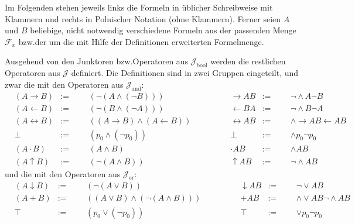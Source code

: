\documentclass[english,ngerman,parskip=half,headsepline,footsepline,
	fleqn,notitlepage]{scrreprt}
\makeatletter
\newcommand*{\defeq}{:=}%
\newcommand*{\ladd}{+}
\newcommand*{\lmult}{\cdot}
\newcommand*{\ltrue}{\top}%
\newcommand*{\lfalse}{\bot}%
\newcommand*{\lrep}{\leftarrow}%
\newcommand*{\limp}{\rightarrow}%
\newcommand*{\lequiv}{\leftrightarrow}%
\newcommand*{\lnand}{\uparrow}%
\newcommand*{\lnor}{\downarrow}%
\newcommand*{\asFx}{\mathcal{F}_x}%
\newcommand*{\asJ}{\mathcal{J}}%
\newcommand*{\xAnd}{\mathrm{and}}%
\newcommand*{\xBool}{\mathrm{bool}}%
\newcommand*{\xOr}{\mathrm{or}}%
\newcommand*{\formulatoleft}{&&&&&&&&&&}%
\newcommand*{\formulaspace}{&&&&}%
\newcommand*{\textbzw}{bzw.\@ }
\makeatother
\begin{document}
	Im Folgenden stehen jeweils links die Formeln in üblicher Schreibweise mit Klammern und rechts in Polnischer Notation (ohne Klammern).
	Ferner seien $A$ und $B$ beliebige, nicht notwendig verschiedene Formeln aus der passenden Menge $\asFx$ \textbzw der um die mit Hilfe der Definitionen erweiterten Formelmenge.

	Ausgehend von den Junktoren \textbzw Operatoren aus $\asJ_\xBool$ werden die restlichen Operatoren aus $\asJ$ definiert. Die Definitionen sind in zwei Gruppen eingeteilt, und zwar die mit den Operatoren aus $\asJ_\xAnd$:
	\begin{align}
		&                (A \limp B)  &\defeq & & & (\lnot (A \land (\lnot B)))
		& \formulaspace &   \limp A B &\defeq & & & \lnot \land A \lnot B
		\label{def:imp}
		\\
		&                (A \lrep B)  &\defeq & & & (\lnot (B \land (\lnot A)))
		& \formulaspace &   \lrep B A &\defeq & & & \lnot \land B \lnot A
		\label{def:rep}
		\\
		&              (A \lequiv B)  &\defeq & & & ((A\limp B)\land(A\lrep B))
		& \formulaspace & \lequiv A B &\defeq & & & \land \limp A B \lrep A B
		\label{def:equiv}
		\\
		&                     \lfalse & \defeq & & & (p_0 \land (\lnot p_0))
		& \formulaspace &     \lfalse & \defeq & & & \land p_0 \lnot p_0
		\label{def:false}
		\\
		&               (A \lmult B)  & \defeq & & & (A \land B)
		& \formulaspace &  \lmult A B & \defeq & & & \land A B
		\label{def:mult}
		\\
		&               (A \lnand B)  &\defeq & & & (\lnot (A \land B ))
		& \formulaspace &  \lnand A B &\defeq & & & \lnot \land A B
		\label{def:nand}
		\formulatoleft
	\end{align}
	und die mit den Operatoren aus $\asJ_\xOr$:
	\begin{align}
		&                (A \lnor B)  & \defeq & & & (\lnot (A \lor B))
		& \formulaspace &   \lnor A B & \defeq & & & \lnot \lor A B
		\label{def:nor}
		\\
		& (A \ladd B) & \defeq & & & ((A\lor B)\land(\lnot(A\land B)))
		& \formulaspace &   \ladd A B & \defeq & & & \land\lor A B\lnot\land A B
		\label{def:add}
		\\
		&                      \ltrue & \defeq & & & (p_0 \lor (\lnot p_0))
		& \formulaspace &      \ltrue & \defeq & & & \lor p_0 \lnot p_0
		\label{def:true}
		\formulatoleft
	\end{align}
\end{document}
